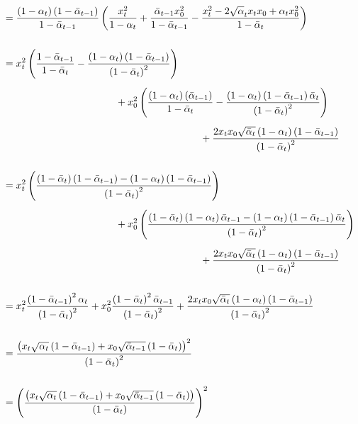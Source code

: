\documentclass[twoside]{article}
\numberwithin{equation}{section}
\numberwithin{figure}{section}
\begin{document}
\begin{align}
    &= \frac{\left(1 - \alpha_t\right)\left(1 - \bar{\alpha}_{t-1}\right)}{1 - \bar{\alpha}_{t-1}} \left( \frac{x_t^2}{1 - \alpha_t} + \frac{\bar{\alpha}_{t-1} x_0^2}{1 - \bar{\alpha}_{t-1}} - \frac{x_t^2 - 2 \sqrt{\alpha}_t x_t x_0 + \alpha_t x_0^2}{1 - \bar{\alpha}_{t}} \right) \\[15pt]
    &= x_t^2 \left(\frac{1 - \bar{\alpha}_{t-1}}{1 - \bar{\alpha}_t} - \frac{\left(1 - \alpha_t\right) \left(1 - \bar{\alpha}_{t-1}\right)}{\left(1 - \bar{\alpha}_t\right)^2}\right) \\[5pt]
    & \hspace{4cm}+ x_0^2 \left( \frac{\left(1 - \alpha_t\right)\left(\bar{\alpha}_{t-1}\right)}{1 - \bar{\alpha}_t} - \frac{\left(1 - \alpha_t\right)\left(1 - \bar{\alpha}_{t-1}\right)\bar{\alpha}_t}{\left(1 - \bar{\alpha}_t\right)^2} \right) \notag \\[5pt]
    & \hspace{7cm} + \frac{2 x_t x_0 \sqrt{\bar{\alpha}_t}\left(1 - \alpha_t\right)\left(1 - \bar{\alpha}_{t-1}\right)}{\left(1 - \bar{\alpha}_{t}\right)^2} \notag \\[15pt]
    &= x_t^2 \left(\frac{ \left( 1 - \bar{\alpha}_t \right) \left( 1 - \bar{\alpha}_{t-1} \right) - \left(1 - \alpha_t\right) \left(1 - \bar{\alpha}_{t-1}\right)}{\left(1 - \bar{\alpha}_t\right)^2}\right) \\[5pt]
    & \hspace{4cm} + x_0^2 \left( \frac{ \left( 1 - \bar{\alpha}_t \right) \left( 1 - \alpha_t \right) \bar{\alpha}_{t-1} - \left(1 - \alpha_t\right)\left(1 - \bar{\alpha}_{t-1}\right)\bar{\alpha}_t}{\left(1 - \bar{\alpha}_t\right)^2} \right) \notag \\[5pt]
    & \hspace{7cm} + \frac{2 x_t x_0 \sqrt{\bar{\alpha}_t}\left(1 - \alpha_t\right)\left(1 - \bar{\alpha}_{t-1}\right)}{\left(1 - \bar{\alpha}_{t}\right)^2} \notag \\[15pt]
    &= x_t^2 \frac{ \left( 1 - \bar{\alpha}_{t-1} \right)^2 \alpha_t }{\left(1 - \bar{\alpha}_t\right)^2} + x_0^2 \frac{\left( 1 - \bar{\alpha}_{t} \right)^2 \bar{\alpha}_{t-1}}{\left(1 - \bar{\alpha}_t\right)^2} + \frac{2 x_t x_0 \sqrt{\bar{\alpha}_t}\left(1 - \alpha_t\right)\left(1 - \bar{\alpha}_{t-1}\right)}{\left(1 - \bar{\alpha}_{t}\right)^2} \\[15pt]
    &= \frac{\left( x_t \sqrt{\alpha_t} \left( 1 - \bar{\alpha}_{t-1} \right) + x_0 \sqrt{\bar{\alpha}_{t-1}} \left( 1 - \bar{\alpha}_t \right) \right)^2}{\left(1 - \bar{\alpha}_{t}\right)^2} \\[15pt]
    &= \left(\frac{\left( x_t \sqrt{\alpha_t} \left( 1 - \bar{\alpha}_{t-1} \right) + x_0 \sqrt{\bar{\alpha}_{t-1}} \left( 1 - \bar{\alpha}_t \right) \right)}{\left(1 - \bar{\alpha}_{t}\right)} \right)^2
\end{align}
\end{document}
